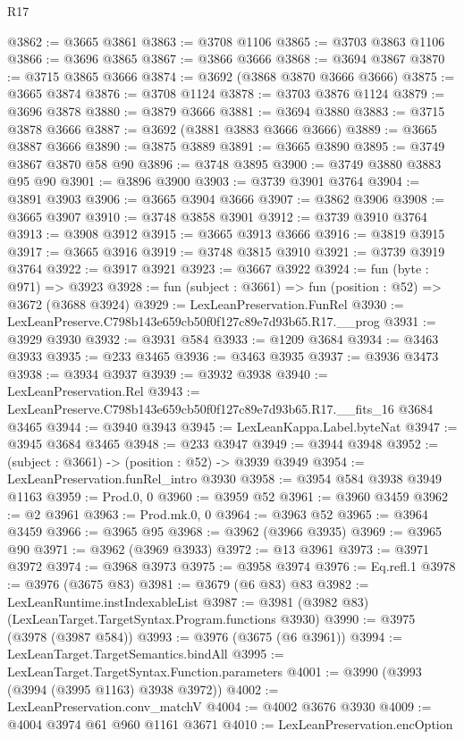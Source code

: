 \begin{lexlean}{R17}
\begin{coremodule}
@3862 := @3665 @3861
@3863 := @3708 @1106
@3865 := @3703 @3863 @1106
@3866 := @3696 @3865
@3867 := @3866 @3666
@3868 := @3694 @3867
@3870 := @3715 @3865 @3666
@3874 := @3692 (@3868 @3870 @3666 @3666)
@3875 := @3665 @3874
@3876 := @3708 @1124
@3878 := @3703 @3876 @1124
@3879 := @3696 @3878
@3880 := @3879 @3666
@3881 := @3694 @3880
@3883 := @3715 @3878 @3666
@3887 := @3692 (@3881 @3883 @3666 @3666)
@3889 := @3665 @3887 @3666
@3890 := @3875 @3889
@3891 := @3665 @3890
@3895 := @3749 @3867 @3870 @58 @90
@3896 := @3748 @3895
@3900 := @3749 @3880 @3883 @95 @90
@3901 := @3896 @3900
@3903 := @3739 @3901 @3764
@3904 := @3891 @3903
@3906 := @3665 @3904 @3666
@3907 := @3862 @3906
@3908 := @3665 @3907
@3910 := @3748 @3858 @3901
@3912 := @3739 @3910 @3764
@3913 := @3908 @3912
@3915 := @3665 @3913 @3666
@3916 := @3819 @3915
@3917 := @3665 @3916
@3919 := @3748 @3815 @3910
@3921 := @3739 @3919 @3764
@3922 := @3917 @3921
@3923 := @3667 @3922
@3924 := fun (byte : @971) => @3923
@3928 := fun (subject : @3661) => fun (position : @52) => @3672 (@3688 @3924)
@3929 := LexLeanPreservation.FunRel
@3930 := LexLeanPreserve.C798b143e659cb50f0f127c89e7d93b65.R17.__prog
@3931 := @3929 @3930
@3932 := @3931 @584
@3933 := @1209 @3684
@3934 := @3463 @3933
@3935 := @233 @3465
@3936 := @3463 @3935
@3937 := @3936 @3473
@3938 := @3934 @3937
@3939 := @3932 @3938
@3940 := LexLeanPreservation.Rel
@3943 := LexLeanPreserve.C798b143e659cb50f0f127c89e7d93b65.R17.__fits_16 @3684 @3465
@3944 := @3940 @3943
@3945 := LexLeanKappa.Label.byteNat
@3947 := @3945 @3684 @3465
@3948 := @233 @3947
@3949 := @3944 @3948
@3952 := (subject : @3661) -> (position : @52) -> @3939 @3949
@3954 := LexLeanPreservation.funRel_intro @3930
@3958 := @3954 @584 @3938 @3949 @1163
@3959 := Prod.{0, 0}
@3960 := @3959 @52
@3961 := @3960 @3459
@3962 := @2 @3961
@3963 := Prod.mk.{0, 0}
@3964 := @3963 @52
@3965 := @3964 @3459
@3966 := @3965 @95
@3968 := @3962 (@3966 @3935)
@3969 := @3965 @90
@3971 := @3962 (@3969 @3933)
@3972 := @13 @3961
@3973 := @3971 @3972
@3974 := @3968 @3973
@3975 := @3958 @3974
@3976 := Eq.refl.{1}
@3978 := @3976 (@3675 @83)
@3981 := @3679 (@6 @83) @83
@3982 := LexLeanRuntime.instIndexableList
@3987 := @3981 (@3982 @83) (LexLeanTarget.TargetSyntax.Program.functions @3930)
@3990 := @3975 (@3978 (@3987 @584))
@3993 := @3976 (@3675 (@6 @3961))
@3994 := LexLeanTarget.TargetSemantics.bindAll
@3995 := LexLeanTarget.TargetSyntax.Function.parameters
@4001 := @3990 (@3993 (@3994 (@3995 @1163) @3938 @3972))
@4002 := LexLeanPreservation.conv_matchV
@4004 := @4002 @3676 @3930
@4009 := @4004 @3974 @61 @960 @1161 @3671
@4010 := LexLeanPreservation.encOption

\end{coremodule}
\end{lexlean}
